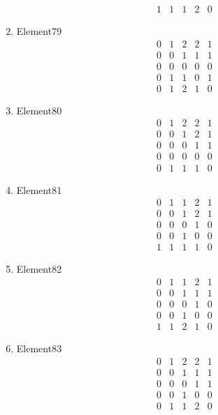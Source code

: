 \documentclass[12pt]{article}
\begin{document}
\begin{multicols}{3}
\begin{enumerate}
\begin{equation*}
\begin{array}{ccccc}
1&1&1&2&0
\end{array}
\end{equation*}
\item Element79
\begin{equation*}
\begin{array}{ccccc}
0&1&2&2&1\\
0&0&1&1&1\\
0&0&0&0&0\\
0&1&1&0&1\\
0&1&2&1&0
\end{array}
\end{equation*}
\item Element80
\begin{equation*}
\begin{array}{ccccc}
0&1&2&2&1\\
0&0&1&2&1\\
0&0&0&1&1\\
0&0&0&0&0\\
0&1&1&1&0
\end{array}
\end{equation*}
\item Element81
\begin{equation*}
\begin{array}{ccccc}
0&1&1&2&1\\
0&0&1&2&1\\
0&0&0&1&0\\
0&0&1&0&0\\
1&1&1&1&0
\end{array}
\end{equation*}
\item Element82
\begin{equation*}
\begin{array}{ccccc}
0&1&1&2&1\\
0&0&1&1&1\\
0&0&0&1&0\\
0&0&1&0&0\\
1&1&2&1&0
\end{array}
\end{equation*}
\item Element83
\begin{equation*}
\begin{array}{ccccc}
0&1&2&2&1\\
0&0&1&1&1\\
0&0&0&1&1\\
0&0&1&0&0\\
0&1&1&2&0
\end{array}
\end{equation*}

\end{enumerate}
\end{multicols}
\end{document}
